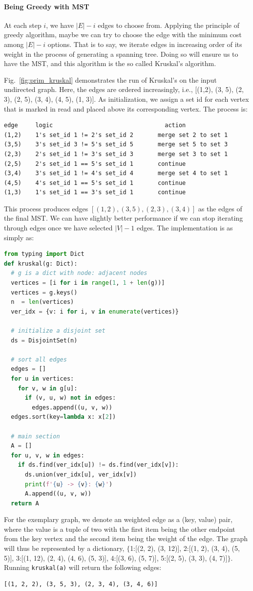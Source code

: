 \documentclass[../main.tex]{subfiles}
\begin{document}
\paragraph{Being Greedy with MST } 
 At each step $i$, we have $|E|-i$ edges to choose from. Applying the principle of greedy algorithm, maybe we can try to choose the edge with the minimum cost among $|E|-i$ options. That is to say, we iterate edges in increasing order of its weight in the process of generating a spanning tree. Doing so will ensure us to have the MST, and this algorithm is the so called Kruskal's algorithm. 

Fig.~\ref{fig:prim_kruskal} demonstrates the run of Kruskal's on the input undirected graph. Here, the edges are ordered increasingly, i.e., [(1,2), (3, 5), (2, 3), (2, 5), (3, 4), (4, 5), (1, 3)]. As initialization,  we assign a set id for each vertex that is marked in read and placed above its corresponding vertex. The process is:
\begin{lstlisting}[numbers=none]
edge     logic                                action
(1,2)    1's set_id 1 != 2's set_id 2       merge set 2 to set 1
(3,5)    3's set_id 3 != 5's set_id 5       merge set 5 to set 3
(2,3)    2's set_id 1 != 3's set_id 3       merge set 3 to set 1
(2,5)    2's set_id 1 == 5's set_id 1       continue
(3,4)    3's set_id 1 != 4's set_id 4       merge set 4 to set 1
(4,5)    4's set_id 1 == 5's set_id 1       continue
(1,3)    1's set_id 1 == 3's set_id 1       continue
\end{lstlisting}
This process produces edges $[(1,2), (3,5), (2,3), (3, 4)]$ as the edges of the final MST. We can have slightly better performance if we can stop iterating through edges once we have selected $|V|-1$ edges. The implementation is as simply as:
\begin{lstlisting}[language=Python]
from typing import Dict
def kruskal(g: Dict):
  # g is a dict with node: adjacent nodes
  vertices = [i for i in range(1, 1 + len(g))]
  vertices = g.keys()
  n  = len(vertices)
  ver_idx = {v: i for i, v in enumerate(vertices)}

  # initialize a disjoint set
  ds = DisjointSet(n)

  # sort all edges
  edges = []
  for u in vertices:
    for v, w in g[u]:
      if (v, u, w) not in edges:
        edges.append((u, v, w))
  edges.sort(key=lambda x: x[2])
  
  # main section
  A = []
  for u, v, w in edges:
    if ds.find(ver_idx[u]) != ds.find(ver_idx[v]):
      ds.union(ver_idx[u], ver_idx[v])
      print(f'{u} -> {v}: {w}')
      A.append((u, v, w))
  return A
\end{lstlisting}
For the exemplary graph, we denote an weighted edge as a (key, value) pair, where the value is a tuple of two with the first item being the other endpoint from the key vertex and the second item being the weight of the edge.  The graph will thus be represented by a dictionary, $\{$1:[(2, 2), (3, 12)], 2:[(1, 2), (3, 4), (5, 5)], 3:[(1, 12), (2, 4), (4, 6), (5, 3)], 4:[(3, 6),  (5, 7)], 5:[(2, 5), (3, 3), (4, 7)]$\}$. Running \texttt{kruskal(a)} will return the following edges:
\begin{lstlisting}[numbers=none]
[(1, 2, 2), (3, 5, 3), (2, 3, 4), (3, 4, 6)]
\end{lstlisting}
\end{document}
